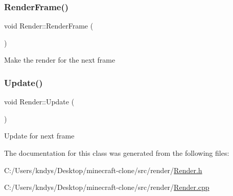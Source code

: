 \subsubsection{\texorpdfstring{Render\+Frame()}{RenderFrame()}}
{\footnotesize\ttfamily void Render\+::\+Render\+Frame (\begin{DoxyParamCaption}{ }\end{DoxyParamCaption})}



Make the render for the next frame 

\mbox{\label{class_render_ac89a109349d00f88fc3405c3ac82ee52}} 
\subsubsection{\texorpdfstring{Update()}{Update()}}
{\footnotesize\ttfamily void Render\+::\+Update (\begin{DoxyParamCaption}{ }\end{DoxyParamCaption})}



Update for next frame 



The documentation for this class was generated from the following files\+:\begin{DoxyCompactItemize}
\item 
C\+:/\+Users/kndys/\+Desktop/minecraft-\/clone/src/render/\mbox{\hyperlink{_render_8h}{Render.\+h}}\item 
C\+:/\+Users/kndys/\+Desktop/minecraft-\/clone/src/render/\mbox{\hyperlink{_render_8cpp}{Render.\+cpp}}\end{DoxyCompactItemize}
